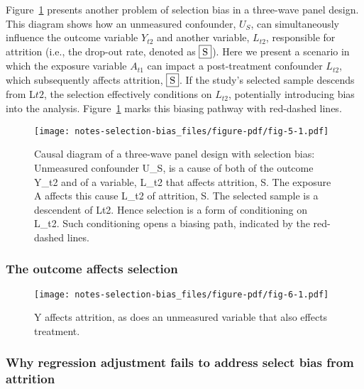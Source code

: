 \documentclass[
  singlecolumn,
  9pt]{article}
\begin{document}
Figure~\ref{fig-5} presents another problem of selection bias in a
three-wave panel design. This diagram shows how an unmeasured
confounder, \(U_S\), can simultaneously influence the outcome variable
\(Y_{t2}\) and another variable, \(L_{t2}\), responsible for attrition
(i.e., the drop-out rate, denoted as \(\framebox{S}\)). Here we present
a scenario in which the exposure variable \(A_{t1}\) can impact a
post-treatment confounder \(L_{t2}\), which subsequently affects
attrition, \(\framebox{S}\). If the study's selected sample descends
from L\({t2}\), the selection effectively conditions on \(L_{t2}\),
potentially introducing bias into the analysis. Figure~\ref{fig-5} marks
this biasing pathway with red-dashed lines.

\begin{figure}

{\centering \texttt{[image: notes-selection-bias\_files/figure-pdf/fig-5-1.pdf]}

}

\caption{\label{fig-5}Causal diagram of a three-wave panel design with
selection bias: Unmeasured confounder U\_S, is a cause of both of the
outcome Y\_t2 and of a variable, L\_t2 that affects attrition, S. The
exposure A affects this cause L\_t2 of attrition, S. The selected sample
is a descendent of Lt2. Hence selection is a form of conditioning on
L\_t2. Such conditioning opens a biasing path, indicated by the
red-dashed lines.}

\end{figure}

\subsubsection{The outcome affects
selection}\label{the-outcome-affects-selection}

\begin{figure}

{\centering \texttt{[image: notes-selection-bias\_files/figure-pdf/fig-6-1.pdf]}

}

\caption{\label{fig-6}Y affects attrition, as does an unmeasured
variable that also effects treatment.}

\end{figure}

\subsubsection{Why regression adjustment fails to address select bias
from
attrition}\label{why-regression-adjustment-fails-to-address-select-bias-from-attrition}
\end{document}
